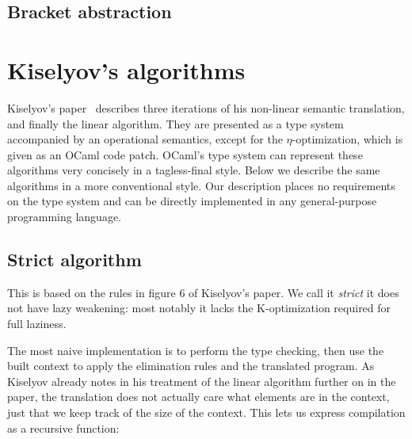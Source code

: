 \documentclass[conference]{IEEEtran}
\begin{document}
\subsection{Bracket abstraction}

\section{Kiselyov's algorithms}
\label{sec:kiselyov}
Kiselyov's paper~\cite{kiselyov_lambda_2018} describes three iterations of his non-linear semantic translation, and finally the linear algorithm.
They are presented as a type system accompanied by an operational semantics, except for the $\eta$-optimization, which is given as an OCaml code patch.
OCaml's type system can represent these algorithms very concisely in a tagless-final style.
Below we describe the same algorithms in a more conventional style.
Our description places no requirements on the type system and can be directly implemented in any general-purpose programming language.

\subsection{Strict algorithm}
This is based on the rules in figure 6 of Kiselyov's paper.
We call it \textit{strict} it does not have lazy weakening: most notably it lacks the K-optimization required for full laziness.

The most naive implementation is to perform the type checking, then use the built context to apply the elimination rules and the translated program.
As Kiselyov already notes in his treatment of the linear algorithm further on in the paper, the translation does not actually care what elements are in the context, just that we keep track of the size of the context.
This lets us express compilation as a recursive function:
\end{document}
